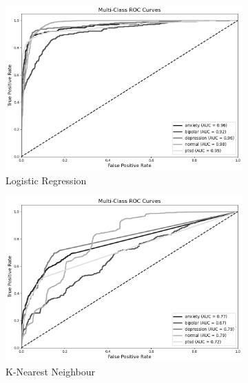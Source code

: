 \begin{figure}[H]
    \begin{subfigure}[b]{0.49\textwidth}
        \centering
        \includegraphics[width=\textwidth]{Images/HP LR ROC.png}
        \caption{Logistic Regression}
        \label{LSTMROC3}  %
    \end{subfigure}
    \hfill
    \vspace{0.5cm}
    \begin{subfigure}[b]{0.49\textwidth}
        \centering
        \includegraphics[width=\textwidth]{Images/HP KNN ROC.png}
        \caption{K-Nearest Neighbour}
        \label{LSTMROC5}  %
    \end{subfigure}
    \hfill
    \begin{subfigure}[b]{0.49\textwidth}
        \centering

\end{subfigure}
\end{figure}
